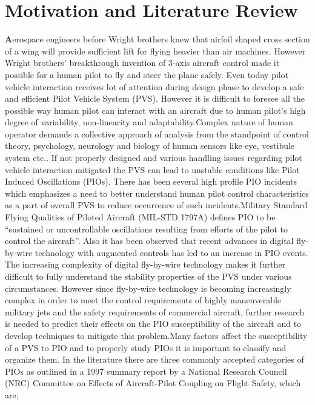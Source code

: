 \section{Motivation and Literature Review}
\doublespacing
\par \lettrine[lraise=0.3,loversize=1]{\textbf{A}}{}erospace engineers before Wright brothers knew that airfoil shaped cross section of a wing will provide sufficient lift for flying heavier than air machines. However Wright brothers' breakthrough invention of 3-axis aircraft control made it possible for a human pilot to fly and steer the plane safely\cite{birthofflightcontrol}. Even today pilot vehicle interaction receives lot of attention during design phase to develop a safe and efficient Pilot Vehicle System (PVS). However it is difficult to foresee all the possible way human pilot can interact with an aircraft due to human pilot's high degree of variability, non-linearity and adaptability.Complex nature of human operator demands a collective approach of analysis from the standpoint of control theory, psychology, neurology and biology of human sensors like eye, vestibule system etc.\cite{mcruer1965human}\cite{mcruer1969theory}\cite{hosman1999pilot}. If not properly designed and various handling issues regarding pilot vehicle interaction mitigated the PVS can lead to unstable conditions like Pilot Induced Oscillations (PIOs)\cite{McRuerPIO}. There has been several high profile PIO incidents\cite{SAABPIO}\cite{YF22} which emphasizes a need to better understand human pilot control characteristics as a part of overall PVS to reduce occurrence of such incidents.Military Standard Flying Qualities of Piloted Aircraft (MIL-STD 1797A)\cite{MLSTD} defines PIO to be “sustained or uncontrollable oscillations resulting from efforts of the pilot to control the aircraft”. Also it has been observed that recent advances in digital fly-by-wire technology with augmented controls has led to an increase in PIO events\cite{BoeingPIO}\cite{Norton}\cite{hoh1982bandwidth}\cite{hess1991technique}\cite{green1986design}. The increasing complexity of digital fly-by-wire technology makes it  further difficult to fully understand the stability properties of the PVS under various circumstances. However since fly-by-wire technology is becoming increasingly complex in order to meet the control requirements of highly maneuverable military jets and the safety requirements of commercial aircraft, further research is needed to predict their effects on the PIO susceptibility of the aircraft and to develop techniques to mitigate this problem.Many factors affect the susceptibility of a PVS to PIO and to properly study PIOs it is important to classify and organize them. In the literature there are three commonly accepted categories of PIOs as outlined in a 1997 summary report by a National Research Council (NRC) Committee on Effects of Aircraft-Pilot Coupling on Flight Safety\cite{mcruer1997aviation}, which are;\\
